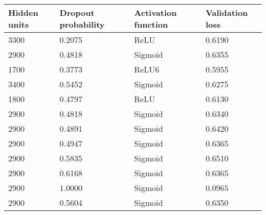 \documentclass[12pt,fleqn]{article}
\begin{document}
\begin{table}[]
	\begin{tabular}{|l|l|l|l|}
		\hline
		Hidden units & Dropout probability & Activation function & Validation loss \\ \hline
		3300         & 0.2075              & ReLU                & 0.6190          \\ \hline
		2900         & 0.4818              & Sigmoid             & 0.6355          \\ \hline
		1700         & 0.3773              & ReLU6               & 0.5955          \\ \hline
		3400         & 0.5452              & Sigmoid             & 0.6275          \\ \hline
		1800         & 0.4797              & ReLU                & 0.6130          \\ \hline
		2900         & 0.4818              & Sigmoid             & 0.6340          \\ \hline
		2900         & 0.4891              & Sigmoid             & 0.6420          \\ \hline
		2900         & 0.4947              & Sigmoid             & 0.6365          \\ \hline
		2900         & 0.5835              & Sigmoid             & 0.6510          \\ \hline
		2900         & 0.6168              & Sigmoid             & 0.6365          \\ \hline
		2900         & 1.0000              & Sigmoid             & 0.0965          \\ \hline
		2900         & 0.5604              & Sigmoid             & 0.6350          \\ \hline
	\end{tabular}
\end{table}
 
\end{document}
